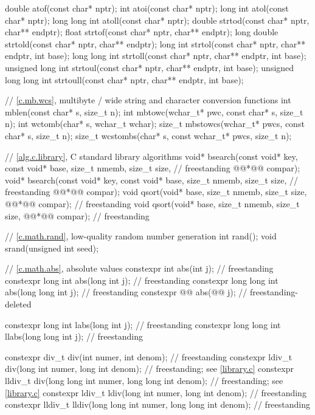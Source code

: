 \begin{codeblock}
{  double atof(const char* nptr);
  int atoi(const char* nptr);
  long int atol(const char* nptr);
  long long int atoll(const char* nptr);
  double strtod(const char* nptr, char** endptr);
  float strtof(const char* nptr, char** endptr);
  long double strtold(const char* nptr, char** endptr);
  long int strtol(const char* nptr, char** endptr, int base);
  long long int strtoll(const char* nptr, char** endptr, int base);
  unsigned long int strtoul(const char* nptr, char** endptr, int base);
  unsigned long long int strtoull(const char* nptr, char** endptr, int base);

  // \ref{c.mb.wcs}, multibyte / wide string and character conversion functions
  int mblen(const char* s, size_t n);
  int mbtowc(wchar_t* pwc, const char* s, size_t n);
  int wctomb(char* s, wchar_t wchar);
  size_t mbstowcs(wchar_t* pwcs, const char* s, size_t n);
  size_t wcstombs(char* s, const wchar_t* pwcs, size_t n);

  // \ref{alg.c.library}, C standard library algorithms
  void* bsearch(const void* key, const void* base, size_t nmemb, size_t size,   // freestanding
                @@*@\itcorr[-1]@ compar);
  void* bsearch(const void* key, const void* base, size_t nmemb, size_t size,   // freestanding
                @@*@\itcorr[-1]@ compar);
  void qsort(void* base, size_t nmemb, size_t size, @@*@\itcorr[-1]@ compar);    // freestanding
  void qsort(void* base, size_t nmemb, size_t size, @@*@\itcorr[-1]@ compar);      // freestanding

  // \ref{c.math.rand}, low-quality random number generation
  int rand();
  void srand(unsigned int seed);

  // \ref{c.math.abs}, absolute values
  constexpr int abs(int j);                                             // freestanding
  constexpr long int abs(long int j);                                   // freestanding
  constexpr long long int abs(long long int j);                         // freestanding
  constexpr @@ abs(@@ j);            // freestanding-deleted

  constexpr long int labs(long int j);                                  // freestanding
  constexpr long long int llabs(long long int j);                       // freestanding

  constexpr div_t div(int numer, int denom);                            // freestanding
  constexpr ldiv_t div(long int numer, long int denom);                 // freestanding; see \ref{library.c}
  constexpr lldiv_t div(long long int numer, long long int denom);      // freestanding; see \ref{library.c}
  constexpr ldiv_t ldiv(long int numer, long int denom);                // freestanding
  constexpr lldiv_t lldiv(long long int numer, long long int denom);    // freestanding
}
\end{codeblock}

